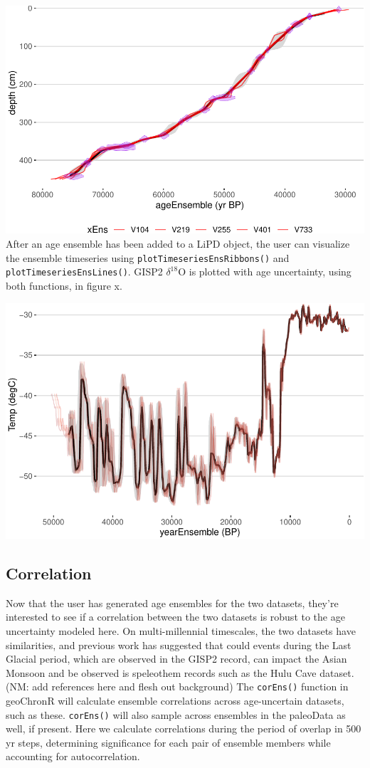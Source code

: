 \documentclass[gc, manuscript]{copernicus}
\begin{document}
\includegraphics{geoChronR-paper_files/figure-latex/unnamed-chunk-3-1.pdf}
After an age ensemble has been added to a LiPD object, the user can
visualize the ensemble timeseries using
\texttt{plotTimeseriesEnsRibbons()} and
\texttt{plotTimeseriesEnsLines()}. GISP2 \(\delta^{18}\)O is plotted
with age uncertainty, using both functions, in figure x.

\includegraphics{geoChronR-paper_files/figure-latex/unnamed-chunk-5-1.pdf}

\subsection{Correlation}

Now that the user has generated age ensembles for the two datasets,
they're interested to see if a correlation between the two datasets is
robust to the age uncertainty modeled here. On multi-millennial
timescales, the two datasets have similarities, and previous work has
suggested that could events during the Last Glacial period, which are
observed in the GISP2 record, can impact the Asian Monsoon and be
observed is speleothem records such as the Hulu Cave dataset. (NM: add
references here and flesh out background) The \texttt{corEns()} function
in geoChronR will calculate ensemble correlations across age-uncertain
datasets, such as these. \texttt{corEns()} will also sample across
ensembles in the paleoData as well, if present. Here we calculate
correlations during the period of overlap in 500 yr steps, determining
significance for each pair of ensemble members while accounting for
autocorrelation.
\end{document}
